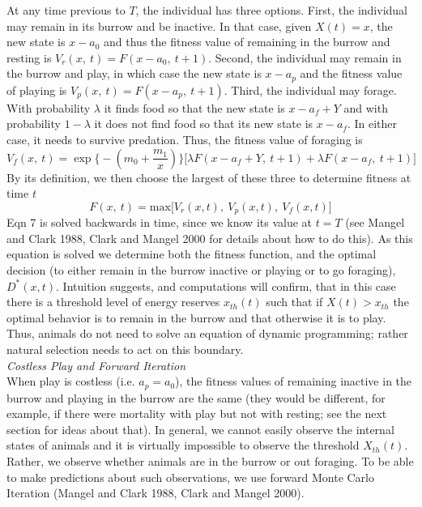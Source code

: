 \documentclass[12pt, letterpaper, fleqn]{article}
\begin{document}
	At any time previous to $T$, the individual has three options.
	First, the individual may remain in its burrow and be inactive.  
	In that case, given $X(t)=x$, the new state is $x-a_0$ and thus the fitness value of remaining in the burrow and resting is \mbox{$V_r(x,~t)=F(x-a_0,~t+1)$.}  
	Second, the individual may remain in the burrow and play, in which case the new state is $x-a_p$ and the fitness value of playing is \mbox{$V_p(x,~t)=F(x-a_p,~t+1)$.} 
	Third, the individual may forage.  
	With probability $\lambda$ it finds food so that the new state is $x-a_f+Y$ and with probability $1-\lambda$ it does not find food so that its new state is $x-a_f$. 
	In either case, it needs to survive predation.
	Thus, the fitness value of foraging is
	\begin{equation}
	\nonumber V_f(x,~t)=\exp\bigg\{-\left(m_0+\frac{m_1}{x}\right)\bigg\}\big[\lambda F(x-a_f+Y,~t+1) + \lambda F(x-a_f,~t+1)\big]
	\end{equation}
	By its definition, we then choose the largest of these three to determine fitness at time $t$
	\begin{equation}
	F(x,~t)=\text{max}\big[V_r(x,t),~V_p(x,t),~V_f(x,t)\big]
	\end{equation}
	Eqn 7 is solved backwards in time, since we know its value at $t=T$ (see Mangel and Clark 1988, Clark and Mangel 2000 for details about how to do this).  
	As this equation is solved we determine both the fitness function, and the optimal decision (to either remain in the burrow inactive or playing or to go foraging), $D^*(x,t)$.  
	Intuition suggests, and computations will confirm, that in this case there is a threshold level of energy reserves $x_{th}(t)$ such that if $X(t)>x_{th}$ the optimal behavior is to remain in the burrow and that otherwise it is to play.  
	Thus, animals do not need to solve an equation of dynamic programming; rather natural selection needs to act on this boundary.\\
	
	
	\noindent\textit{Costless Play and Forward Iteration}\\
	When play is costless (i.e. $a_p=a_0$), the fitness values of remaining inactive in the burrow and playing in the burrow are the same (they would be different, for example, if there were mortality with play but not with resting; see the next section for ideas about that).  
	In general, we cannot easily observe the internal states of animals and it is virtually impossible to observe the threshold $X_{th}(t)$. 
	Rather, we observe whether animals are in the burrow or out foraging.  
	To be able to make predictions about such observations, we use forward Monte Carlo Iteration (Mangel and Clark 1988, Clark and Mangel 2000).
	
\end{document}

